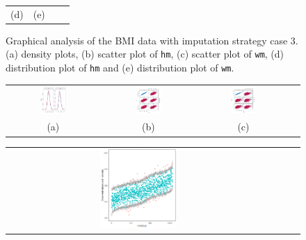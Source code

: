 \documentclass[12pt, fullpage, a4paper]{article}
\begin{document}
\begin{figure} [ht!]
\begin{tabular}{cccc}
		\textnormal{(d)}  & \textnormal{(e)}  \\[6pt]
	\end{tabular}
	\caption{Graphical analysis of the BMI data with imputation strategy case 3. (a) density plots, (b) scatter plot of \texttt{hm}, (c) scatter plot of \texttt{wm}, (d) distribution plot of \texttt{hm} and (e) distribution plot of \texttt{wm}.}
	\label{fig6_11}
\end{figure}


\begin{figure} [ht!]
	\centering
	\begin{tabular}{cccc}
		\includegraphics[width=0.3\textwidth]{plots/densitycase4} &
		\includegraphics[width=0.3\textwidth]{plots/scattercase4hm} &
		\includegraphics[width=0.3\textwidth]{plots/scattercase4wm} \\
		\textnormal{(a)}  & \textnormal{(b)} & \textnormal{(c)}  \\[6pt]
	\end{tabular}
	\begin{tabular}{cccc}
		\includegraphics[width=0.3\textwidth]{plots/distributioncase4hm} &

\end{tabular}
\end{figure}
\end{document}
